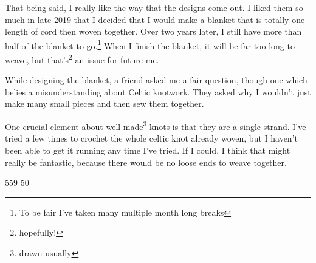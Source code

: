 \documentclass[12pt]{article}[titlepage]
\renewcommand{\,}{\textsuperscript{,}}
\begin{document}
That being said, I really like the way that the designs come out.
I liked them so much in late 2019 that I decided that I would make a blanket that is totally one length of cord then woven together.
Over two years later, I still have more than half of the blanket to go.\footnote{To be fair I've taken many multiple month long breaks}
When I finish the blanket, it will be far too long to weave, but that's\footnote{hopefully!} an issue for future me.

While designing the blanket, a friend asked me a fair question, though one which belies a misunderstanding about Celtic knotwork.
They asked why I wouldn't just make many small pieces and then sew them together.

One crucial element about well-made\footnote{drawn usually} knots is that they are a single strand.
I've tried a few times to crochet the whole celtic knot already woven, but I haven't been able to get it running any time I've tried.
If I could, I think that might really be fantastic, because there would be no loose ends to weave together.

559
50
\end{document}
